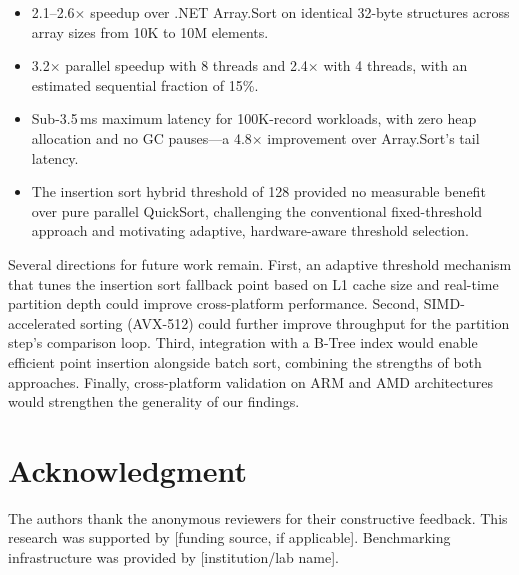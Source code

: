 \documentclass[conference]{IEEEtran}
\begin{document}
\begin{itemize}[nosep]
    \item 2.1--2.6$\times$ speedup over .NET Array.Sort on identical 32-byte structures across array sizes from 10K to 10M elements.
    \item 3.2$\times$ parallel speedup with 8 threads and 2.4$\times$ with 4 threads, with an estimated sequential fraction of 15\%.
    \item Sub-3.5\,ms maximum latency for 100K-record workloads, with zero heap allocation and no GC pauses---a 4.8$\times$ improvement over Array.Sort's tail latency.
    \item The insertion sort hybrid threshold of 128 provided no measurable benefit over pure parallel QuickSort, challenging the conventional fixed-threshold approach and motivating adaptive, hardware-aware threshold selection.
\end{itemize}

Several directions for future work remain. First, an adaptive threshold mechanism that tunes the insertion sort fallback point based on L1 cache size and real-time partition depth could improve cross-platform performance. Second, SIMD-accelerated sorting (AVX-512) could further improve throughput for the partition step's comparison loop. Third, integration with a B-Tree index would enable efficient point insertion alongside batch sort, combining the strengths of both approaches. Finally, cross-platform validation on ARM and AMD architectures would strengthen the generality of our findings.

\section*{Acknowledgment}
\label{sec:acknowledgment}

The authors thank the anonymous reviewers for their constructive feedback. This research was supported by [funding source, if applicable]. Benchmarking infrastructure was provided by [institution/lab name].




\appendices
\end{document}
